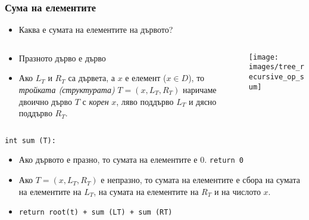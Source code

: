 \documentclass{beamer}
\begin{document}
    
    
    
    
    \begin{frame}[fragile]
    \frametitle{Сума на елементите}
    
        \begin{itemize}
          \item Каква е сумата на елементите на дървото?
        \end{itemize}
    
    
    \begin{columns}[t]
      \begin{column}{0.65\textwidth}
    
        \begin{flushleft}
        \begin{itemize}
          \item Празното дърво е дърво
          \item Ако $L_T$ и $R_T$ са дървета, а $x$ е елемент ($x \in D$), то \emph{тройката (структурата)} $T=(x,L_T,R_T)$ наричаме двоично дърво $T$ с \emph{корен} $x$, ляво поддърво $L_T$ и дясно поддърво $R_T$.
        \end{itemize}
        \end{flushleft}
    
      \end{column}
      \begin{column}{0.35\textwidth}
    
        \texttt{[image: images/tree\_recursive\_op\_sum]}
    
      \end{column}
    \end{columns}
    
    \vspace{-100px}
    
     \texttt{int sum (T):}
    
        \begin{itemize}
          \item Ако дървото е празно, то сумата на елементите е $0$. \texttt{return 0}
          \item  Ако $T=(x,L_T,R_T)$ е непразно, то сумата на елементите е сбора на сумата на елементите на $L_T$, на сумата на елементите на $R_T$ и на числото $x$.
          \item \texttt{return root(t) + sum (LT) + sum (RT)}
        \end{itemize}
    
    \end{frame}
    
\end{document}
